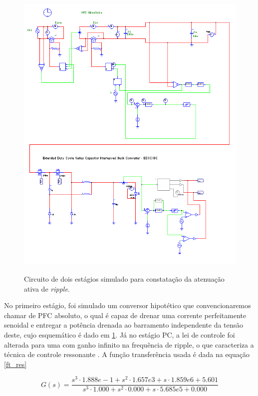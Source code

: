 \documentclass[
        12pt,
        openany, %
        oneside, %
        a4paper,			
        english,			
        brazil
        ]{abntbibufjf}
\begin{document}
\begin{figure}[!h]
	\centering
	\caption{Circuito de dois estágios simulado para constatação da atenuação ativa de \textit{ripple}.}
	\includegraphics[scale=.55]{../ESQUEMAS/PFCA_AND_PC}\\
	\label{PFCA}
\end{figure}

No primeiro estágio, foi simulado um conversor hipotético que convencionaremos chamar de PFC absoluto, o qual é capaz de drenar uma corrente perfeitamente senoidal e entregar a potência drenada ao barramento independente da tensão deste, cujo esquemático é dado em \ref{PFCA}. Já no estágio PC, a lei de controle foi alterada para uma com ganho infinito na frequência de ripple, o que caracteriza a técnica de controle ressonante \cite{ogata}. A função transferência usada é dada na equação \ref{ft_res}

\begin{equation}
G(s)=\frac{s^3\cdot 1.888e-1 +s^2\cdot 1.657e3 +s\cdot 1.859e6 +5.601}{s^3\cdot 1.000 +s^2\cdot 0.000 +s\cdot5.685e5 +0.000}
\label{ft_res}
\end{equation}
\end{document}
